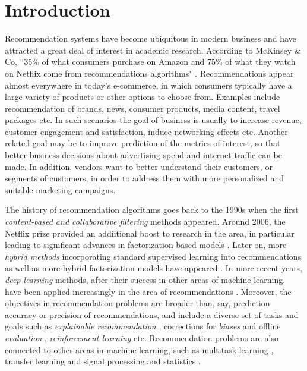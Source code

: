 \section{Introduction}

Recommendation systems have become ubiquitous in modern business and have attracted a great deal of interest in academic research.
According to McKinsey \& Co,
“35\% of what consumers purchase on Amazon and 75\% of what they watch on Netflix come from recommendations algorithms" 
\cite{mckinsey}.
Recommendations appear almost everywhere in today's e-commerce, in which consumers typically have a large variety of products or other
options to choose from. Examples include recommendation of brands, news, consumer products, media content, 
travel packages etc. In such scenarios the goal of business is usually to increase revenue,
customer engagement and satisfaction, induce networking effects etc. Another related goal may be to improve prediction of the metrics of interest, 
so that better business decisions about advertising spend and internet traffic can be made. In addition, vendors want to better understand their customers,
or segments of customers, in order to address them with more personalized and suitable marketing campaigns.

The history of recommendation algorithms goes back to the 1990s \cite{Tapestry, grouplens}
when the first {\em content-based and collaborative filtering} methods appeared.
Around 2006, the Netflix prize \cite{netflix} provided an addiitional boost to research in the area, in particular leading to significant advances in factorization-based models \cite{bell_lessons,koren2009matrix,SVD++,PMF}.
Later on, more {\em hybrid methods} incorporating standard supervised learning into recommendations as well as more hybrid factorization models have appeared
\cite{rendle,ffm,bpr,pairwise,multiverse}.
In more recent years, {\em deep learning} methods, after their success in other areas of machine learning, have been applied increasingly in the area of recommendations
\cite{PNN,cheng2016wide,lian2018xdeepfm,he2017neural,youtube,nvidia,survival}.
Moreover, the objectives in recommendation problems are broader than, say, prediction accuracy or precision of recommendations, and include a diverse set of tasks and goals such as 
{\em explainable recommendation} \cite{explainable,rl_explainable}, corrections for {\em biases} and offline {\em evaluation} \cite{mnar,offline,debiasing,counterfactual},
{\em reinforcement learning} \cite{rl_explainable,rl,rl_negative} etc.
Recommendation problems are also connected to other areas in machine learning, such as multitask learning \cite{caruana,baxter,mtl,evgeniou}, transfer learning \cite{raina,thrun,boost_transfer} 
and signal processing and statistics \cite{tao,recht,tsybakov}.

